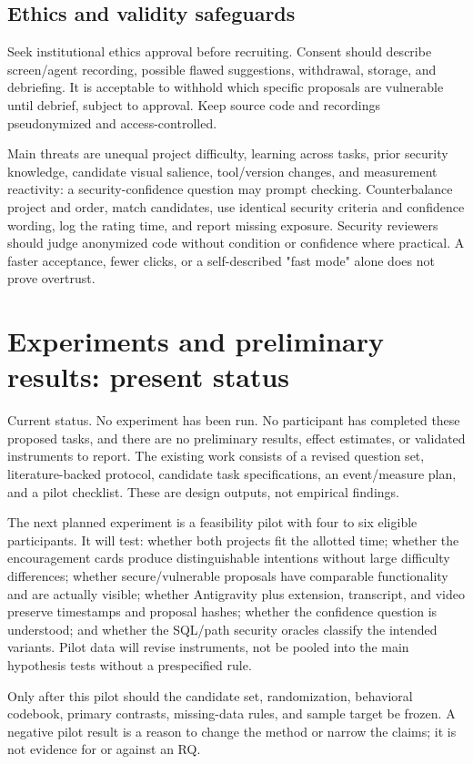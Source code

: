 \documentclass[12pt,a4paper]{article}
\begin{document}
\subsection{Ethics and validity safeguards}
Seek institutional ethics approval before recruiting. Consent should describe screen/agent recording, possible flawed suggestions, withdrawal, storage, and debriefing. It is acceptable to withhold which specific proposals are vulnerable until debrief, subject to approval. Keep source code and recordings pseudonymized and access-controlled.

Main threats are unequal project difficulty, learning across tasks, prior security knowledge, candidate visual salience, tool/version changes, and measurement reactivity: a security-confidence question may prompt checking. Counterbalance project and order, match candidates, use identical security criteria and confidence wording, log the rating time, and report missing exposure. Security reviewers should judge anonymized code without condition or confidence where practical. A faster acceptance, fewer clicks, or a self-described "fast mode" alone does not prove overtrust.

\section{Experiments and preliminary results: present status}
Current status. No experiment has been run. No participant has completed these proposed tasks, and there are no preliminary results, effect estimates, or validated instruments to report. The existing work consists of a revised question set, literature-backed protocol, candidate task specifications, an event/measure plan, and a pilot checklist. These are design outputs, not empirical findings.

The next planned experiment is a feasibility pilot with four to six eligible participants. It will test: whether both projects fit the allotted time; whether the encouragement cards produce distinguishable intentions without large difficulty differences; whether secure/vulnerable proposals have comparable functionality and are actually visible; whether Antigravity plus extension, transcript, and video preserve timestamps and proposal hashes; whether the confidence question is understood; and whether the SQL/path security oracles classify the intended variants. Pilot data will revise instruments, not be pooled into the main hypothesis tests without a prespecified rule.

Only after this pilot should the candidate set, randomization, behavioral codebook, primary contrasts, missing-data rules, and sample target be frozen. A negative pilot result is a reason to change the method or narrow the claims; it is not evidence for or against an RQ.
\end{document}
